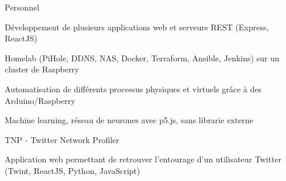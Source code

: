 
\begin{cventries}
  \cventry
    {} %
    {Personnel} %
    {} %
    {} %
    {
      \begin{cvitems} %
        \item {Développement de plusieurs applications web et serveurs REST (Express, ReactJS)}
        \item {Homelab (PiHole, DDNS, NAS, Docker, Terraform, Ansible, Jenkins) sur un cluster de Raspberry}
		\item {Automatisation de différents processus physiques et virtuels grâce à des Arduino/Raspberry}
        \item {Machine learning, réseau de neurones avec p5.js, sans librarie externe}
      \end{cvitems}
    }

  \cventry
    {} %
    {TNP - Twitter Network Profiler} %
    {} %
    {} %
    {
      \begin{cvitems} %
      	\item {Application web permettant de retrouver l'entourage d'un utilisateur Twitter (Twint, ReactJS, Python, JavaScript)}
      \end{cvitems}
    }
\end{cventries}